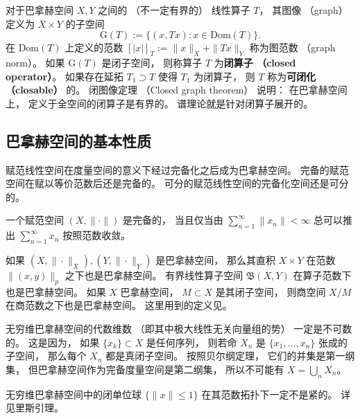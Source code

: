 对于巴拿赫空间 $X,Y$ 之间的 （不一定有界的） 线性算子 $T$， 其图像 （graph） 定义为 $X\times Y$ 的子空间
$$
\text{G}(T):=\{(x,Tx):x\in \text{Dom}(T)\}.
$$
在 $\text{Dom}(T)$ 上定义的范数 $[|x|]_T:=\|x\|_X+\|Tx\|_Y$ 称为图范数 （graph norm）。 如果 $\text{G}(T)$ 是闭子空间， 则称算子 $T$ 为\textbf{闭算子 （closed operator）}。 如果存在延拓 $T_1\supset T$ 使得 $T_1$ 为闭算子， 则 $T$ 称为\textbf{可闭化 （closable）} 的。 闭图像定理 （Closed graph theorem） 说明： 在巴拿赫空间上， 定义于全空间的闭算子是有界的。 谱理论就是针对闭算子展开的。

\subsection{巴拿赫空间的基本性质}
赋范线性空间在度量空间的意义下经过完备化之后成为巴拿赫空间。 完备的赋范空间在赋以等价范数后还是完备的。 可分的赋范线性空间的完备化空间还是可分的。 

一个赋范空间 $(X,\|\cdot\|)$ 是完备的， 当且仅当由 $\sum _{n=1}^{\infty }\|x_{n}\|<\infty $ 总可以推出 $\sum _{n=1}^{\infty }x_{n}$ 按照范数收敛。

如果 $(X,\|\cdot\|_X),(Y,\|\cdot\|_Y)$ 是巴拿赫空间， 那么其直积 $X\times Y$ 在范数 $\|(x,y)\|_{p}$ 之下也是巴拿赫空间。 有界线性算子空间 $\mathfrak{B}(X,Y)$ 在算子范数下也是巴拿赫空间。 如果 $X$ 巴拿赫空间， $M\subset X$ 是其闭子空间， 则商空间 $X/M$ 在商范数之下也是巴拿赫空间。 这里用到的定义见。

无穷维巴拿赫空间的代数维数 （即其中极大线性无关向量组的势） 一定是不可数的。 这是因为， 如果 $\{x_k\}\subset X$ 是任何序列， 则若命 $X_n$ 是 $\{x_1,...,x_n\}$ 张成的子空间， 那么每个 $X_n$ 都是真闭子空间。 按照贝尔纲定理， 它们的并集是第一纲集， 但巴拿赫空间作为完备度量空间是第二纲集， 所以不可能有 $X=\bigcup_n X_n$。

无穷维巴拿赫空间中的闭单位球 $\{\|x\|\leq1\}$ 在其范数拓扑下一定不是紧的。 详见里斯引理。